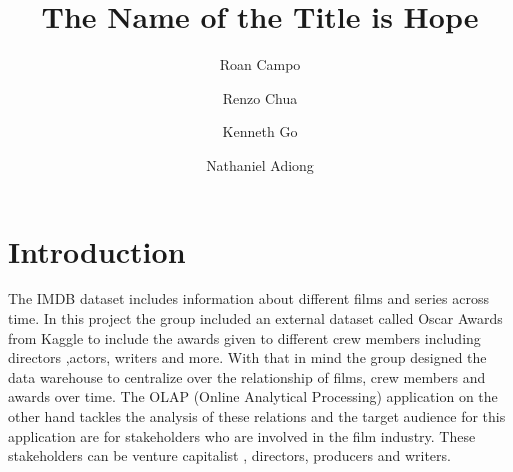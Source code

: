 \documentclass[sigconf, pbalance]{acmart}
\begin{document}
\title{The Name of the Title is Hope}


\author{Roan Campo}

\author{Renzo Chua}

\author{Kenneth Go}

\author{Nathaniel Adiong}

\renewcommand{\shortauthors}{Trovato et al.}


\maketitle

\section{Introduction}

The IMDB dataset includes information about different films and series across time. In this project the group included an external dataset called Oscar Awards from Kaggle \cite{FontesLu} to include the awards given to different crew members including directors ,actors, writers and more.  With that in mind the group designed the data warehouse to centralize over the relationship of films, crew members and awards over time. The OLAP  (Online Analytical Processing) application on the other hand tackles the analysis of these relations and the target audience for this application are for stakeholders who are involved in the film industry. These stakeholders can be venture capitalist \cite{investopedia2025vc}, directors, producers and writers.
\end{document}
